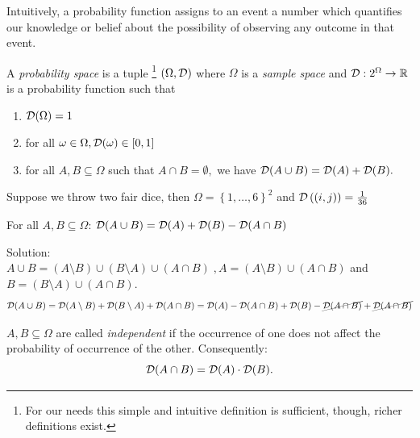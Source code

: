 Intuitively, a probability function assigns to an event a number which quantifies our knowledge or belief about the possibility of observing any outcome in that event.


\begin{definition}
A \emph{probability space} is a tuple \footnote{For our needs this simple and intuitive definition is sufficient, though, richer definitions exist.} $(\Omega, \mathcal{D})$ where $\Omega$ is a \emph{sample space} and $\mathcal{D}:2^{\Omega}\rightarrow\mathbb{R}$ is a probability function such that
\begin{enumerate}
\item $\mathcal{D}(\Omega)=1$
\item for all $\omega\in\Omega, \mathcal{D}(\omega)\in[0,1]$
\item for all $A,B\subseteq\Omega$ such that $A\cap B=\emptyset,$ we have $\mathcal{D}(A \cup B)=\mathcal{D}(A)+\mathcal{D}(B).$
\end{enumerate}
\end{definition}
\begin{example}
Suppose we throw two fair dice, then $\Omega=\left\{ 1,\dots,6\right\} ^{2}$ and $\mathcal{D}\left(\left(i,j\right)\right)=\frac{1}{36}$
\end{example}

\begin{exercise}
For all $A,B\subseteq\Omega$: $\mathcal{D}(A\cup B)=\mathcal{D}(A)+\mathcal{D}(B)-\mathcal{D}(A\cap B)$
\end{exercise}
Solution:\\
$A\cup B=(A\setminus B)\cup(B\setminus A)\cup(A\cap B)\; ,A=(A\setminus B)\cup(A\cap B)$ and $B=(B\setminus A)\cup(A\cap B).$
$$\mathcal{D}(A\cup B)=\mathcal{D}(A\setminus B)+\mathcal{D}(B\setminus A)+\mathcal{D}(A\cap B)=\mathcal{D}(A)-\mathcal{D}(A\cap B)+\mathcal{D}(B) - \cancel{\mathcal{D}(A\cap B)}  + \cancel{\mathcal{D}(A\cap B)} $$

\begin{definition}
$A,B\subseteq\Omega$ are called \emph{independent} if the occurrence of one does not affect the probability of occurrence of the other. Consequently: $$\mathcal{D}(A\cap B) =\mathcal{D}(A)\cdot\mathcal{D}(B).$$
\end{definition}

